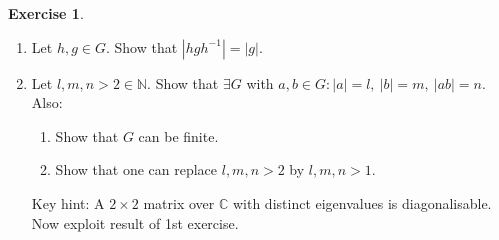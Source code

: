 \documentclass[a4paper]{article}
\theoremstyle{definition}
\newtheorem{exe}[defn]{Exercise}
\begin{document}
\begin{exe}
\label{exe:conjaugatesordersequal}
\begin{enumerate}
\item Let $h,g\in G$. Show that $\left|hgh^{-1}\right|=|g|$.
\item Let $l,m,n>2\in\mathbb N$. Show that $\exists G$ with $a,b\in G:|a|=l,\ |b|=m,\ |ab|=n$. Also:
\begin{enumerate}
\item Show that $G$ can be finite.
\item Show that one can replace $l,m,n>2$ by $l,m,n>1$.
\end{enumerate}
Key hint: A $2\times 2$ matrix over $\mathbb C$ with distinct eigenvalues is diagonalisable. Now exploit result of 1st exercise.
\end{enumerate}
\end{exe}
\end{document}
